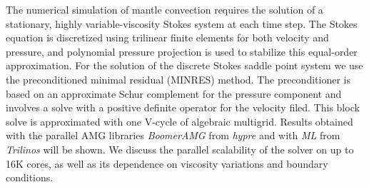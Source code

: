 \documentclass{report}
\begin{document}
The numerical simulation of mantle convection requires the solution of a
stationary, highly variable-viscosity Stokes system at each time step.
The Stokes equation is discretized using trilinear finite elements for
both velocity and pressure, and polynomial pressure projection is used to
stabilize this equal-order approximation. For the solution of the
discrete Stokes saddle point system we use the preconditioned minimal
residual (MINRES) method. The preconditioner is based on an approximate
Schur complement for the pressure component and involves a solve with a
positive definite operator for the velocity filed. This block solve is
approximated with one V-cycle
of algebraic multigrid. Results obtained with the parallel AMG
libraries {\em BoomerAMG} from {\em hypre} and with {\em ML} from
{\em Trilinos} will be shown. We discuss the parallel scalability of the
solver on up to 16K cores, as well as its dependence on viscosity
variations and boundary conditions.
\end{document}
